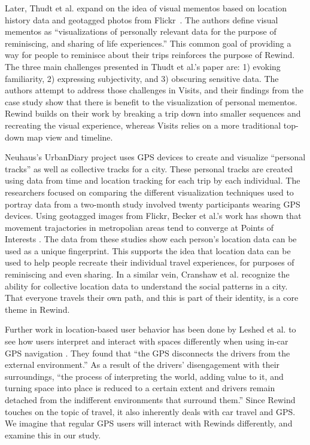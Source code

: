 \documentclass{sigchi}
\begin{document}
Later, Thudt et al. expand on the idea of visual mementos based on location history data and geotagged photos from Flickr~\cite{thudt2016visual}. The authors define visual mementos as ``visualizations of personally relevant data for the purpose of reminiscing, and sharing of life experiences.'' This common goal of providing a way for people to reminisce about their trips reinforces the purpose of Rewind.
The three main challenges presented in Thudt et al.'s paper are: 1) evoking familiarity, 2) expressing subjectivity, and 3) obscuring sensitive data. The authors attempt to address those challenges in Visits, and their findings from the case study show that there is benefit to the visualization of personal mementos. Rewind builds on their work by breaking a trip down into smaller sequences and recreating the visual experience, whereas Visits relies on a more traditional top-down map view and timeline.

Neuhaus's UrbanDiary project \cite{neuhaus2010urbandiary} uses GPS devices to create and visualize ``personal tracks'' as well as collective tracks for a city. These personal tracks are created using data from time and location tracking for each trip by each individual. The researchers focused on comparing the different visualization techniques used to portray data from a two-month study involved twenty participants wearing GPS devices. Using geotagged images from Flickr, Becker et al.'s work has shown that movement trajactories in metropolian areas tend to converge at Points of Interests \cite{Becker2015}. The data from these studies show each person's location data can be used as a unique fingerprint. This supports the idea that location data can be used to help people recreate their individual travel experiences, for purposes of reminiscing and even sharing. In a similar vein, Cranshaw et al. \cite{cranshaw2012livehoods} recognize the ability for collective location data to understand the social patterns in a city. That everyone travels their own path, and this is part of their identity, is a core theme in Rewind.

Further work in location-based user behavior has been done by Leshed et al. to see how users interpret and interact with spaces differently when using in-car GPS navigation \cite{leshed2008car}. They found that ``the GPS disconnects the drivers from the external environment.'' As a result of the drivers' disengagement with their surroundings, ``the process of interpreting the world, adding value to it, and turning space into place is reduced to a certain extent and drivers remain detached from the indifferent environments that surround them.'' Since Rewind touches on the topic of travel, it also inherently deals with car travel and GPS. We imagine that regular GPS users will interact with Rewinds differently, and examine this in our study.
\end{document}
